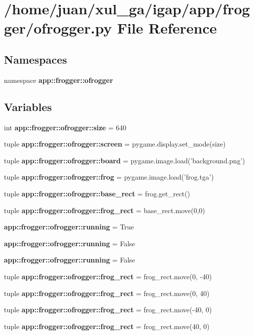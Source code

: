 \section{/home/juan/xul\_\-ga/igap/app/frogger/ofrogger.py File Reference}
\label{ofrogger_8py}
\subsection*{Namespaces}
\begin{CompactItemize}
\item 
namespace {\bf app::frogger::ofrogger}
\end{CompactItemize}
\subsection*{Variables}
\begin{CompactItemize}
\item 
int {\bf app::frogger::ofrogger::size} = 640
\item 
tuple {\bf app::frogger::ofrogger::screen} = pygame.display.set\_\-mode(size)
\item 
tuple {\bf app::frogger::ofrogger::board} = pygame.image.load('background.png')
\item 
tuple {\bf app::frogger::ofrogger::frog} = pygame.image.load('frog.tga')
\item 
tuple {\bf app::frogger::ofrogger::base\_\-rect} = frog.get\_\-rect()
\item 
tuple {\bf app::frogger::ofrogger::frog\_\-rect} = base\_\-rect.move(0,0)
\item 
{\bf app::frogger::ofrogger::running} = True
\item 
{\bf app::frogger::ofrogger::running} = False
\item 
{\bf app::frogger::ofrogger::running} = False
\item 
tuple {\bf app::frogger::ofrogger::frog\_\-rect} = frog\_\-rect.move(0, -40)
\item 
tuple {\bf app::frogger::ofrogger::frog\_\-rect} = frog\_\-rect.move(0, 40)
\item 
tuple {\bf app::frogger::ofrogger::frog\_\-rect} = frog\_\-rect.move(-40, 0)
\item 
tuple {\bf app::frogger::ofrogger::frog\_\-rect} = frog\_\-rect.move(40, 0)
\end{CompactItemize}
